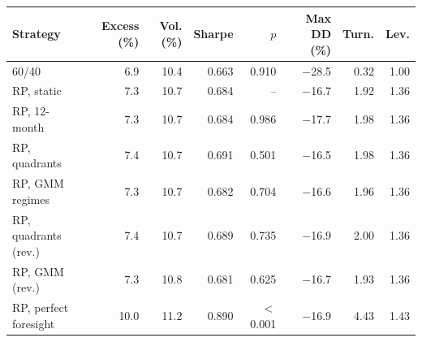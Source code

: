 \begin{tabular}{lrrrrrrr}
\toprule
Strategy & Excess (\%) & Vol. (\%) & Sharpe & $p$ & Max DD (\%) & Turn. & Lev. \\
\midrule
60/40 & 6.9 & 10.4 & 0.663 & 0.910 & $-$28.5 & 0.32 & 1.00 \\
RP, static & 7.3 & 10.7 & 0.684 & -- & $-$16.7 & 1.92 & 1.36 \\
RP, 12-month & 7.3 & 10.7 & 0.684 & 0.986 & $-$17.7 & 1.98 & 1.36 \\
RP, quadrants & 7.4 & 10.7 & 0.691 & 0.501 & $-$16.5 & 1.98 & 1.36 \\
RP, GMM regimes & 7.3 & 10.7 & 0.682 & 0.704 & $-$16.6 & 1.96 & 1.36 \\
RP, quadrants (rev.) & 7.4 & 10.7 & 0.689 & 0.735 & $-$16.9 & 2.00 & 1.36 \\
RP, GMM (rev.) & 7.3 & 10.8 & 0.681 & 0.625 & $-$16.7 & 1.93 & 1.36 \\
RP, perfect foresight & 10.0 & 11.2 & 0.890 & $<$0.001 & $-$16.9 & 4.43 & 1.43 \\
\bottomrule
\end{tabular}
